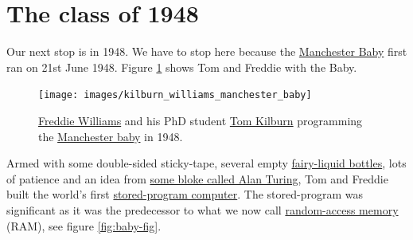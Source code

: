 \documentclass[
  12pt,
]{book}
\begin{document}
\hypertarget{y1948}{%
\section{The class of 1948}\label{y1948}}

Our next stop is in 1948. We have to stop here because the \href{https://en.wikipedia.org/wiki/Manchester_Baby}{Manchester Baby} first ran on 21st June 1948. Figure \ref{fig:tomfred-fig} shows Tom and Freddie with the Baby. \citep{lavington}

\begin{figure}

{\centering \texttt{[image: images/kilburn\_williams\_manchester\_baby]} 

}

\caption{\href{https://en.wikipedia.org/wiki/Frederic_Calland_Williams}{Freddie Williams} and his PhD student \href{https://en.wikipedia.org/wiki/Tom_Kilburn}{Tom Kilburn} programming the \href{https://en.wikipedia.org/wiki/Manchester_Baby}{Manchester baby} in 1948.}\label{fig:tomfred-fig}
\end{figure}



Armed with some double-sided sticky-tape, several empty \href{https://en.wikipedia.org/wiki/Fairy_(brand)}{fairy-liquid bottles}, lots of patience and an idea from \href{https://en.wikipedia.org/wiki/Alan_Turing}{some bloke called Alan Turing}, Tom and Freddie built the world's first \href{https://en.wikipedia.org/wiki/Stored-program_computer}{stored-program computer}. The stored-program was significant as it was the predecessor to what we now call \href{https://en.wikipedia.org/wiki/Random-access_memory}{random-access memory} (RAM), see figure \ref{fig:baby-fig}. \citep{longway-baby}
\end{document}
